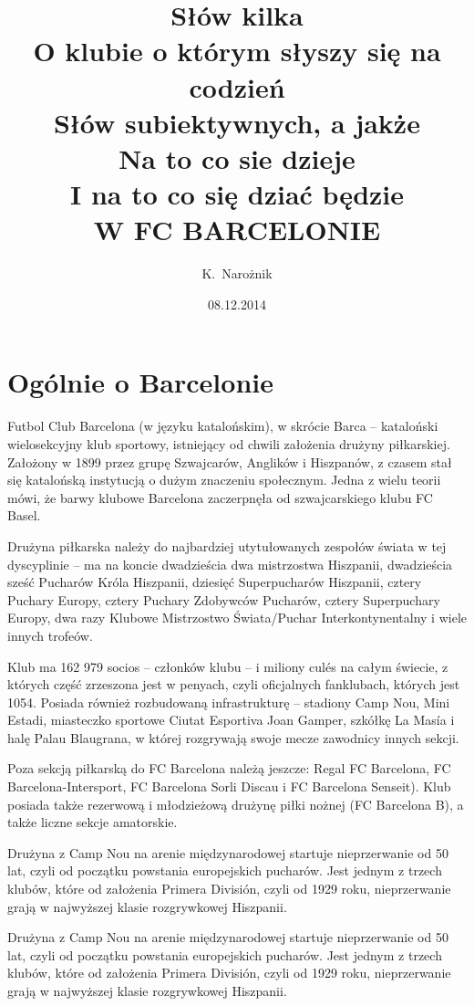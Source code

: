 \documentclass[11pt, a4paper]{article}
\author{K.~Narożnik}
\title{Słów kilka\\ O klubie o którym słyszy się na codzień \\
Słów subiektywnych, a jakże\\ Na to co sie dzieje\\ I na to co się dziać będzie\\
W FC BARCELONIE}
\date{08.12.2014}
\begin{document}
\maketitle

\newpage
\tableofcontents
\newpage

\section{Ogólnie o Barcelonie}
\label{sec:Ogolnie}

Futbol Club Barcelona (w języku katalońskim), w skrócie Barca – kataloński wielosekcyjny klub sportowy, istniejący od chwili założenia drużyny piłkarskiej. Założony w 1899 przez grupę Szwajcarów, Anglików i Hiszpanów, z czasem stał się katalońską instytucją o dużym znaczeniu społecznym. Jedna z wielu teorii mówi, że barwy klubowe Barcelona zaczerpnęła od szwajcarskiego klubu FC Basel.

Drużyna piłkarska należy do najbardziej utytułowanych zespołów świata w tej dyscyplinie – ma na koncie dwadzieścia dwa mistrzostwa Hiszpanii, dwadzieścia sześć Pucharów Króla Hiszpanii, dziesięć Superpucharów Hiszpanii, cztery Puchary Europy, cztery Puchary Zdobywców Pucharów, cztery Superpuchary Europy, dwa razy Klubowe Mistrzostwo Świata/Puchar Interkontynentalny i wiele innych trofeów.

Klub ma 162 979 socios – członków klubu – i miliony culés na całym świecie, z których część zrzeszona jest w penyach, czyli oficjalnych fanklubach, których jest 1054. Posiada również rozbudowaną infrastrukturę – stadiony Camp Nou, Mini Estadi, miasteczko sportowe Ciutat Esportiva Joan Gamper, szkółkę La Masía i halę Palau Blaugrana, w której rozgrywają swoje mecze zawodnicy innych sekcji.

Poza sekcją piłkarską do FC Barcelona należą jeszcze: Regal FC Barcelona, FC Barcelona-Intersport, FC Barcelona Sorli Discau i FC Barcelona Senseit). Klub posiada także rezerwową i młodzieżową drużynę piłki nożnej (FC Barcelona B), a także liczne sekcje amatorskie.

Drużyna z Camp Nou na arenie międzynarodowej startuje nieprzerwanie od 50 lat, czyli od początku powstania europejskich pucharów. Jest jednym z trzech klubów, które od założenia Primera División, czyli od 1929 roku, nieprzerwanie grają w najwyższej klasie rozgrywkowej Hiszpanii.

Drużyna z Camp Nou na arenie międzynarodowej startuje nieprzerwanie od 50 lat, czyli od początku powstania europejskich pucharów. Jest jednym z trzech klubów, które od założenia Primera División, czyli od 1929 roku, nieprzerwanie grają w najwyższej klasie rozgrywkowej Hiszpanii.
\end{document}
